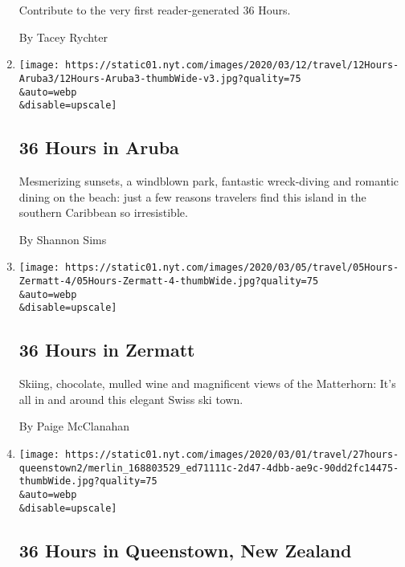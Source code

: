\begin{enumerate}
  Contribute to the very first reader-generated 36 Hours.

  By Tacey Rychter
\item
  \href{/2020/03/12/travel/what-to-do-36-hours-in-aruba.html}{}

  \texttt{[image: https://static01.nyt.com/images/2020/03/12/travel/12Hours-Aruba3/12Hours-Aruba3-thumbWide-v3.jpg?quality=75\\\&auto=webp\\\&disable=upscale]}

  \hypertarget{36-hours-in-aruba}{%
  \subsection{36 Hours in Aruba}\label{36-hours-in-aruba}}

  Mesmerizing sunsets, a windblown park, fantastic wreck-diving and
  romantic dining on the beach: just a few reasons travelers find this
  island in the southern Caribbean so irresistible.

  By Shannon Sims
\item
  \href{/2020/03/05/travel/what-to-do-36-hours-in-zermatt.html}{}

  \texttt{[image: https://static01.nyt.com/images/2020/03/05/travel/05Hours-Zermatt-4/05Hours-Zermatt-4-thumbWide.jpg?quality=75\\\&auto=webp\\\&disable=upscale]}

  \hypertarget{36-hours-in-zermatt}{%
  \subsection{36 Hours in Zermatt}\label{36-hours-in-zermatt}}

  Skiing, chocolate, mulled wine and magnificent views of the
  Matterhorn: It's all in and around this elegant Swiss ski town.

  By Paige McClanahan
\item
  \href{/2020/02/27/travel/what-to-do-36-hours-in-queenstown.html}{}

  \texttt{[image: https://static01.nyt.com/images/2020/03/01/travel/27hours-queenstown2/merlin\_168803529\_ed71111c-2d47-4dbb-ae9c-90dd2fc14475-thumbWide.jpg?quality=75\\\&auto=webp\\\&disable=upscale]}

  \hypertarget{36-hours-in-queenstown-new-zealand}{%
  \subsection{36 Hours in Queenstown, New
  Zealand}\label{36-hours-in-queenstown-new-zealand}}


\end{enumerate}

